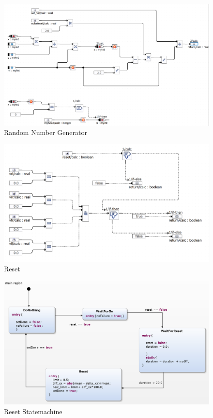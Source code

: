 \begin{figure}[h!]
	\centering
	\includegraphics[width=1\linewidth]{../Graphiken/RandomGenerator.png}
	\caption{Random Number Generator}
	\label{fig:RandomGenerator}
\end{figure}

\begin{figure}[h!]
	\centering
	\includegraphics[width=1\linewidth]{../Graphiken/Reset.png}
	\caption{Reset}
	\label{fig:Reset}
\end{figure}

\begin{figure}[h!]
	\centering
	\includegraphics[width=1\linewidth]{../Graphiken/ResetStateMachine.png}
	\caption{Reset Statemachine}
	\label{fig:ResetStateMachine}
\end{figure}

